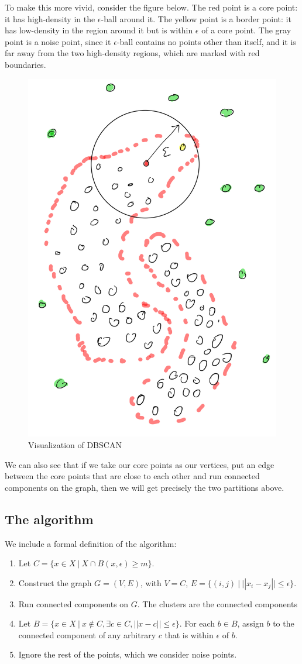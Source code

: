   To make this more vivid, consider the figure below. The red point is a core point:
  it has high-density in the $\epsilon$-ball around it. The yellow point is a border
  point: it has low-density in the region around it but is within $\epsilon$ of
  a core point. The gray point is a noise point, since it $\epsilon$-ball
  contains no points other than itself, and it is far away from the two high-density
  regions, which are marked with red boundaries.

  \begin{figure}[h]
  \centering
  \includegraphics[width=.4\linewidth]{chapter_2/files/dbscan.png}
  \caption{Visualization of DBSCAN}
  \end{figure}

  We can also see that if we take our core points as our vertices, put an edge between
  the core points that are close to each other and run connected components on
  the graph, then we will get precisely the two partitions above.

  \subsection{The algorithm}

  We include a formal definition of the algorithm:

  \begin{enumerate}
  \item Let $C=\{x \in X \ | \ X \cap B(x, \epsilon) \geq m\}$.
  \item Construct the graph $G=(V,E)$, with $V=C$, $E=\{(i,j) \ | \ ||x_i-x_j|| \leq \epsilon\}$.
  \item Run connected components on $G$. The clusters are the connected components
  \item Let $B=\{x \in X \ | \ x \notin C, \exists c \in C, ||x-c|| \leq \epsilon\}$.
  For each $b \in B$, assign $b$ to the connected component of any arbitrary $c$
  that is within $\epsilon$ of $b$.
  \item Ignore the rest of the points, which we consider noise points.

  \end{enumerate}

